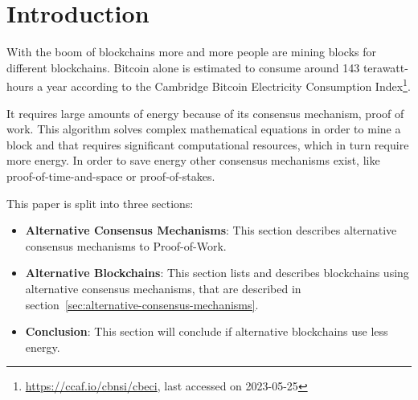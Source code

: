 
\section{Introduction}\label{sec:introduction}
With the boom of blockchains more and more people are mining blocks for different blockchains.
Bitcoin alone is estimated to consume around 143 terawatt-hours a year according to the Cambridge Bitcoin Electricity Consumption Index\footnote{\url{https://ccaf.io/cbnsi/cbeci}, last accessed on 2023-05-25}.

It requires large amounts of energy because of its consensus mechanism, proof of work.\cite{why-does-bitcoin-use-so-much-energy}
This algorithm solves complex mathematical equations in order to mine a block and that requires significant computational resources, which in turn require more energy.
In order to save energy other consensus mechanisms exist, like proof-of-time-and-space or proof-of-stakes.

This paper is split into three sections:
\begin{itemize}
    \item\textbf{Alternative Consensus Mechanisms}: This section describes alternative consensus mechanisms to Proof-of-Work.
    \item\textbf{Alternative Blockchains}: This section lists and describes blockchains using alternative consensus mechanisms, that are described in section\ \ref{sec:alternative-consensus-mechanisms}.
    \item\textbf{Conclusion}: This section will conclude if alternative blockchains use less energy.
\end{itemize}

